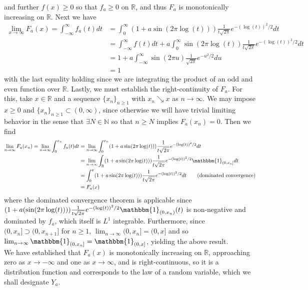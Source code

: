 \documentclass[10pt]{article}
\newcommand{\mbb}[1]{\mathbb{#1}}
\newcommand{\1}[1]{\mathbbm{1}_{#1}}
\begin{document}
    and further $f(x)\geq 0$ so that $f_a\geq 0$ on $\mbb{R}$, and thus $F_a$ is monotonically increasing on $\mbb{R}$. Next we have
    \begin{align*}
        \lim_{x\rightarrow\infty}F_a(x)=\int_{-\infty}^\infty f_a(t)dt&=\int_0^\infty(1+a\sin(2\pi\log(t)))\frac{1}{t\sqrt{2\pi}}e^{-(\log(t))^2/2}dt\\
        &=\int_{-\infty}^\infty f(t)dt+a\int_{0}^\infty \sin(2\pi\log(t))\frac{1}{t\sqrt{2\pi}}e^{-(\log(t))^2/2}dt\\
        &=1+a\int_{-\infty}^\infty\sin(2\pi u)\frac{1}{\sqrt{2\pi}}e^{-u^2/2}du\tag{setting $u=\log(t)$}\\
        &=1
    \end{align*}
    with the last equality holding since we are integrating the product of an odd and even function over $\mbb{R}$. Lastly, we must establish the right-continuity of $F_a$. For this, take $x\in\mbb{R}$ and a sequence $\{x_n\}_{n\geq 1}$ with $x_n\searrow x$ as $n\rightarrow\infty$. We may impose $x\geq0$ and $\{x_n\}_{n\geq 1}\subset(0,\infty)$,
    since otherwise we will have trivial limiting behavior in the sense that $\exists N\in\mbb{N}$ so that $n\geq N$ implies $F_a(x_n)=0$. Then we find
    \begin{align*}
        \lim_{n\rightarrow\infty}F_a(x_n)=\lim_{n\rightarrow\infty}\int_0^{x_n}f_a(t)dt&=\lim_{n\rightarrow\infty}\int_0^{x_n}(1+a\sin(2\pi\log(t)))\frac{1}{t\sqrt{2\pi}}e^{-(\log(t))^2/2}dt\\
        &=\lim_{n\rightarrow\infty}\int_{\mbb{R}}(1+a\sin(2\pi\log(t)))\frac{1}{t\sqrt{2\pi}}e^{-(\log(t))^2/2}\1{(0,x_n]}dt\\
        &=\int_0^x(1+a\sin(2\pi\log(t)))\frac{1}{t\sqrt{2\pi}}e^{-(\log(t))^2/2}dt\tag{dominated convergence}\\
        &=F_a(x)
    \end{align*} 
    where the dominated convergence theorem is applicable since $(1+a(\sin(2\pi\log(t))))\tfrac{1}{t\sqrt{2\pi}}e^{-(\log(t))^2/2}\1{(0,x_n)}(t)$ is non-negative and dominated by $f_a$, which itself is $L^1$ integrable. Furthermore, since $(0,x_n]\supset (0,x_{n+1}]$ for $n\geq 1$, $\lim_{n\rightarrow\infty}(0,x_n]=(0,x]$ and so $\lim_{n\rightarrow\infty}\1{(0,x_n]}=\1{(0,x]}$, yielding the above result.
    \\[5pt]
    We have established that $F_a(x)$ is monotonically increasing on $\mbb{R}$, approaching zero as $x\rightarrow-\infty$ and one as $x\rightarrow\infty$, and is right-continuous, so it is
    a distribution function and corresponds to the law of a random variable, which we shall designate $Y_a$.\\[5pt]
\end{document}
